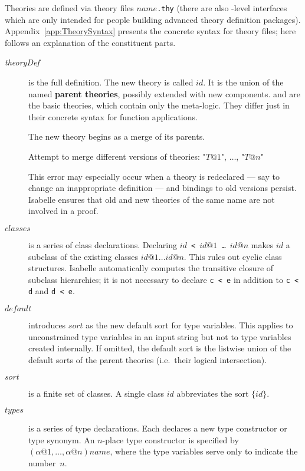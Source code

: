 Theories are defined via theory files $name$\texttt{.thy} (there are also
\ML-level interfaces which are only intended for people building advanced
theory definition packages).  Appendix~\ref{app:TheorySyntax} presents the
concrete syntax for theory files; here follows an explanation of the
constituent parts.
\begin{description}
\item[{\it theoryDef}] is the full definition.  The new theory is called $id$.
  It is the union of the named \textbf{parent
    theories}, possibly extended with new
  components.   and  are the basic theories, which
  contain only the meta-logic.  They differ just in their concrete syntax for
  function applications.
  
  The new theory begins as a merge of its parents.
  \begin{ttbox}
    Attempt to merge different versions of theories: "\(T@1\)", \(\ldots\), "\(T@n\)"
  \end{ttbox}
  This error may especially occur when a theory is redeclared --- say to
  change an inappropriate definition --- and bindings to old versions persist.
  Isabelle ensures that old and new theories of the same name are not involved
  in a proof.

\item[$classes$]
  is a series of class declarations.  Declaring {\tt$id$ < $id@1$ \dots\
    $id@n$} makes $id$ a subclass of the existing classes $id@1\dots
  id@n$.  This rules out cyclic class structures.  Isabelle automatically
  computes the transitive closure of subclass hierarchies; it is not
  necessary to declare \texttt{c < e} in addition to \texttt{c < d} and \texttt{d <
    e}.

\item[$default$]
  introduces $sort$ as the new default sort for type variables.  This applies
  to unconstrained type variables in an input string but not to type
  variables created internally.  If omitted, the default sort is the listwise
  union of the default sorts of the parent theories (i.e.\ their logical
  intersection).
  
\item[$sort$] is a finite set of classes.  A single class $id$ abbreviates the
  sort $\{id\}$.

\item[$types$]
  is a series of type declarations.  Each declares a new type constructor
  or type synonym.  An $n$-place type constructor is specified by
  $(\alpha@1,\dots,\alpha@n)name$, where the type variables serve only to
  indicate the number~$n$.


\end{description}

